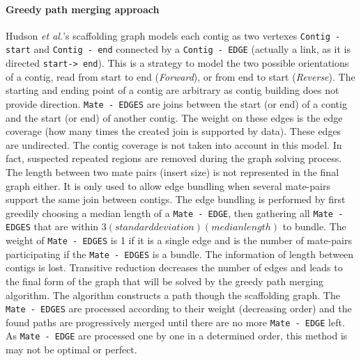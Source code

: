 \documentclass[12pt]{article}
\begin{document}
\paragraph*{Greedy path merging approach}
Hudson \textit{et al.}'s scaffolding graph models each contig as two vertexes \texttt{\footnotesize Contig - start} and \texttt{\footnotesize Contig - end} connected by a \texttt{\footnotesize Contig - EDGE} (actually a link, as it is directed \texttt{\footnotesize start-> end}). This is a strategy to model the two possible orientations of a contig, read from start to end (\textit{Forward}), or from end to start (\textit{Reverse}). The starting and ending point of a contig are arbitrary as contig building does not provide direction. \texttt{\footnotesize Mate - EDGES} are joins between the start (or end) of a contig and the start (or end) of another contig. The weight on these edges is the edge coverage (how many times the created join is supported by data). These edges are undirected. The contig coverage is not taken into account in this model. In fact, suspected repeated regions are removed during the graph solving process. The length between two mate pairs (insert size) is not represented in the final graph either. It is only used to allow edge bundling when several mate-pairs support the same join between contigs. The edge bundling is performed by first greedily choosing a median length of a \texttt{\footnotesize Mate - EDGE}, then gathering all \texttt{\footnotesize Mate - EDGES} that are within $3(standard deviation)(median length)$ to bundle. The weight of \texttt{\footnotesize Mate - EDGES} is 1 if it is a single edge and is the number of mate-pairs participating if the \texttt{\footnotesize Mate - EDGES} is a bundle. The information of length between contigs is lost. Transitive reduction decreases the number of edges and leads to the final form of the graph that will be solved by the greedy path merging algorithm. 
The algorithm constructs a path though the scaffolding graph. The \texttt{\footnotesize Mate - EDGES} are processed according to their weight (decreasing order) and the found paths are progressively merged until there are no more \texttt{\footnotesize Mate - EDGE} left. As \texttt{\footnotesize Mate - EDGE} are processed one by one in a determined order, this method is may not be optimal or perfect. 
\clearpage
\end{document}
